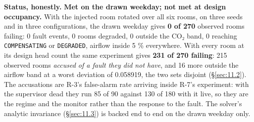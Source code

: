 \textbf{Status, honestly.} \textbf{Met on the drawn weekday; not met at design occupancy.} With the injected room rotated over
all six rooms, on three seeds and in three configurations, the drawn weekday gives \textbf{0 of 270}
observed rooms failing: 0 fault events, 0 rooms degraded, 0 outside the CO₂ band, 0 reaching
\texttt{COMPENSATING} or \texttt{DEGRADED}, airflow inside 5 \% everywhere. With every room at its
design head count the same experiment gives \textbf{231 of 270 failing}: 215 observed rooms
\emph{accused of a fault they did not have}, and 16 more outside the airflow band at a worst
deviation of 0.058919, the two sets disjoint (§\ref{sec:11.2}). The accusations are R-3's false-alarm rate
arriving inside R-7's experiment: with the supervisor dead they run 85 of 90 against 130 of 180 with
it live, so they are the regime and the monitor rather than the response to the fault. The solver's
analytic invariance (§\ref{sec:11.3}) is backed end to end on the drawn weekday only.
